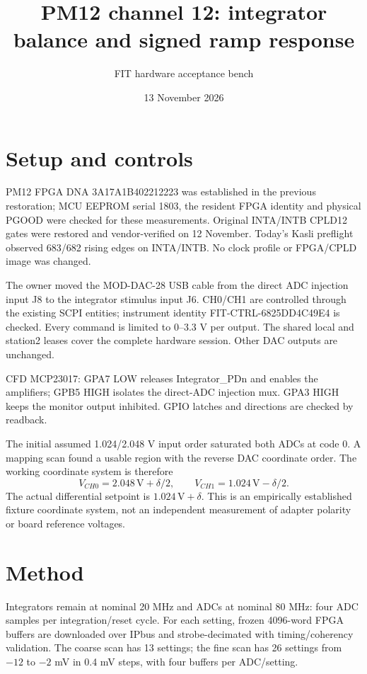 \documentclass[a4paper,11pt]{article}
\begin{document}
\title{PM12 channel 12: integrator balance and signed ramp response}
\author{FIT hardware acceptance bench}\date{13 November 2026}\maketitle
\section{Setup and controls}
PM12 FPGA DNA 3A17A1B402212223 was established in the previous restoration;
MCU EEPROM serial 1803, the resident FPGA identity and physical PGOOD were
checked for these measurements. Original INTA/INTB CPLD12 gates were restored
and vendor-verified on 12 November. Today's Kasli preflight observed 683/682
rising edges on INTA/INTB. No clock profile or FPGA/CPLD image was changed.

The owner moved the MOD-DAC-28 USB cable from the direct ADC injection input
J8 to the integrator stimulus input J6. CH0/CH1 are controlled through the
existing SCPI entities; instrument identity FIT-CTRL-6825DD4C49E4 is checked.
Every command is limited to 0--3.3 V per output. The shared local and station2
leases cover the complete hardware session. Other DAC outputs are unchanged.

CFD MCP23017: GPA7 LOW releases Integrator\_PDn and enables the amplifiers;
GPB5 HIGH isolates the direct-ADC injection mux. GPA3 HIGH keeps the monitor
output inhibited. GPIO latches and directions are checked by readback.

The initial assumed 1.024/2.048 V input order saturated both ADCs at code 0.
A mapping scan found a usable region with the reverse DAC coordinate order.
The working coordinate system is therefore
\[ V_{CH0}=2.048\,\mathrm V+\delta/2,\qquad
   V_{CH1}=1.024\,\mathrm V-\delta/2. \]
The actual differential setpoint is $1.024\,\mathrm V+\delta$.
This is an empirically established fixture coordinate system, not an independent
measurement of adapter polarity or board reference voltages.
\section{Method}
Integrators remain at nominal 20 MHz and ADCs at nominal 80 MHz: four ADC samples
per integration/reset cycle. For each setting, frozen 4096-word FPGA buffers
are downloaded over IPbus and strobe-decimated with timing/coherency validation.
The coarse scan has 13 settings; the fine scan has 26 settings from $-12$ to
$-2$ mV in 0.4 mV steps, with four buffers per ADC/setting.
\end{document}
